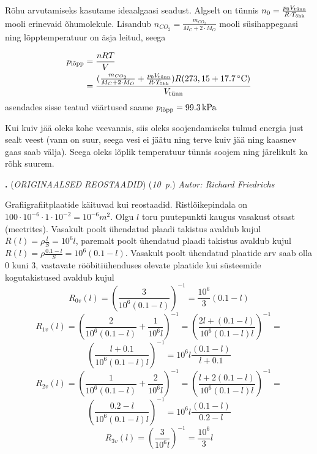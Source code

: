 \documentclass[11pt,a5paper]{article}
\newcommand{\numb}[1]{\vspace{5pt}\textbf{\large #1}}
\newcommand{\nimi}[1]{(\textsl{\small #1})}
\newcommand{\punktid}[1]{(\emph{#1~p.})}
\newcounter{ylesanne}
\newcommand{\yl}[1]{\addtocounter{ylesanne}{1}\numb{\theylesanne.} \nimi{#1} \newblock{}}
\newcommand{\autor}[1]{\emph{ Autor: #1}}%
\begin{document}
Rõhu arvutamiseks kasutame ideaalgaasi seadust. Algselt on tünnis \(n_0 =\frac{p_0V_{\textup{tünn}}}{R\cdot T_{\textup{õhk}}}\) mooli erinevaid õhumolekule. Lisandub \(n_{CO_2} = \frac{m_{CO_2}}{M_{C} + 2\cdot M_{O}}\) mooli süsihappegaasi ning lõpptemperatuur on äsja leitud, seega

\begin{align*}
    p_{\textup{lõpp}} &= \frac{nRT}{V}\\
    &=\frac{(\frac{m_{CO_2}}{M_{C} + 2\cdot M_{O}}+\frac{p_0V_{\textup{tünn}}}{R\cdot T_{\textup{õhk}}})R(273,15 + \SI{17,7}{\degreeCelsius})}{V_{\textup{tünn}}}
\end{align*}
asendades sisse teatud väärtused saame \(p_{\textup{lõpp}} = \SI{99.3}{\kilo\pascal}\)

Kui kuiv jää oleks kohe veevannis, siis oleks soojendamiseks tulnud energia just sealt veest (vann on suur, seega vesi ei jäätu ning terve kuiv jää ning kaasnev gaas saab välja). Seega oleks lõplik temperatuur tünnis soojem ning järelikult ka rõhk suurem.


\yl{ORIGINAALSED REOSTAADID}
\punktid{10} \autor{Richard Friedrichs}

Grafiigrafiitplaatide käituvad kui reostaadid.
Ristlõikepindala on $100 \cdot 10^{-6} \cdot 1 \cdot 10^{-2} = 10^{-6} \si{m^2}$.
Olgu $l$ toru puutepunkti kaugus vasakust otsast (meetrites).
Vasakult poolt ühendatud plaadi takistus avaldub kujul $R(l)=\rho \frac{l}{S} = 10^6 l $, paremalt poolt ühendatud plaadi takistus avaldub kujul $R(l)= \rho \frac{0.1 - l}{S} = 10^6 (0.1-l) $.
Vasakult poolt ühendatud plaatide arv saab olla 0 kuni 3, vastavate rööbitiühenduses olevate plaatide kui süsteemide kogutakistused avaldub kujul
\[ R_{0v}(l) = \left(\frac{3}{10^6 (0.1-l)} \right)^{-1} =  \frac{10^6}{3} (0.1-l) \]
\[ R_{1v}(l) = \left(\frac{2}{10^6 (0.1-l) } + \frac{1}{10^6 l } \right)^{-1} =  
\left(\frac{2l +(0.1-l)}{10^6 (0.1-l)l }\right)^{-1} = \]
\[ \left(\frac{l +0.1}{10^6 (0.1-l)l }\right)^{-1} =10^6 l\frac{(0.1-l)}{l+0.1} \]
\[ R_{2v}(l) = \left(\frac{1}{10^6 (0.1-l) } + \frac{2}{10^6 l } \right)^{-1} =  
\left(\frac{l +2(0.1-l)}{10^6 (0.1-l)l }\right)^{-1} = \]
\[ \left(\frac{0.2-l}{10^6 (0.1-l)l }\right)^{-1} =10^6 l \frac{(0.1-l)}{0.2-l} \]
\[ R_{3v}(l) = \left(\frac{3}{10^6 l} \right)^{-1} =  \frac{10^6}{3}l\]
\end{document}
